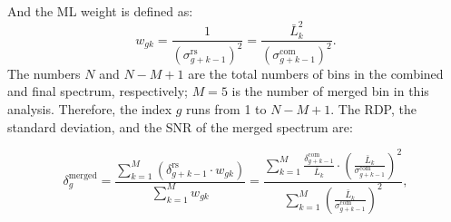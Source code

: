 And the ML weight is defined as: 
\begin{equation}
    \label{eq:merge_weight}
    w_{gk} = \frac{1}{(\sigma_{g+k-1}^\text{rs})^{2}} = \frac{\bar{L}_{k}^{2}}{(\sigma_{g+k-1}^\text{com})^{2}}.
\end{equation}
The numbers $N$ and $N-M+1$ are the total numbers of bins in 
the combined and final spectrum, respectively; $M=5$ is the number of 
merged bin in this analysis. Therefore, the index $g$ runs from 1 to $N-M+1$. 
%
%
%
%
The RDP, the standard deviation, and the SNR of the merged spectrum are:

\begin{equation}
    \delta_{g}^\text{merged} = \frac{ \sum\limits_{k = 1}^{M}\left(\delta_{g+k-1}^\text{rs} \cdot {w_{gk}}\right)}{\sum\limits_{k = 1}^{M} {w_{gk}}} = \frac{\sum\limits_{k = 1}^{M}\frac{\delta_{g+k-1}^\text{com}}{\bar{L}_{k}} \cdot \left(\frac{\bar{L}_{k}}{\sigma_{g+k-1}^\text{com}}\right)^2} {\sum\limits_{k = 1}^{M}\left(\frac{\bar{L}_{k}}{\sigma_{g+k-1}^\text{com}}\right)^2},
    \label{eq:merged_power}
\end{equation}


